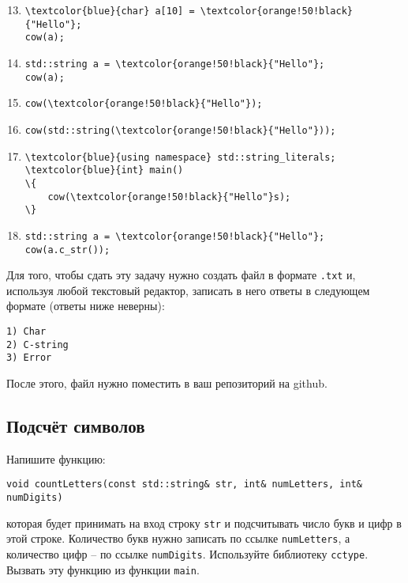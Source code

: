 \documentclass{article}
\begin{document}
\begin{enumerate}
\setcounter{enumi}{12}
\item \begin{Verbatim}[commandchars=\\\{\}]
\textcolor{blue}{char} a[10] = \textcolor{orange!50!black}{"Hello"};
cow(a);
\end{Verbatim}

\item \begin{Verbatim}[commandchars=\\\{\}]
std::string a = \textcolor{orange!50!black}{"Hello"};
cow(a);
\end{Verbatim}

\item \begin{Verbatim}[commandchars=\\\{\}]
cow(\textcolor{orange!50!black}{"Hello"});
\end{Verbatim}

\item \begin{Verbatim}[commandchars=\\\{\}]
cow(std::string(\textcolor{orange!50!black}{"Hello"}));
\end{Verbatim}

\item \begin{Verbatim}[commandchars=\\\{\}]
\textcolor{blue}{using namespace} std::string_literals;
\textcolor{blue}{int} main()
\{
    cow(\textcolor{orange!50!black}{"Hello"}s);
\}
\end{Verbatim}

\item \begin{Verbatim}[commandchars=\\\{\}]
std::string a = \textcolor{orange!50!black}{"Hello"};
cow(a.c_str());
\end{Verbatim}
\end{enumerate}
Для того, чтобы сдать эту задачу нужно создать файл в формате \texttt{.txt} и, используя любой текстовый редактор, записать в него ответы в следующем формате (ответы ниже неверны):
\begin{verbatim}
1) Char
2) C-string
3) Error
\end{verbatim} 
После этого, файл нужно поместить в ваш репозиторий на github.

\subsection{Подсчёт символов}
Напишите функцию:
\begin{lstlisting}
void countLetters(const std::string& str, int& numLetters, int& numDigits)
\end{lstlisting}
которая будет принимать на вход строку \texttt{str} и подсчитывать число букв и цифр в этой строке. Количество букв нужно записать по ссылке \texttt{numLetters}, а количество цифр --  по ссылке \texttt{numDigits}. Используйте библиотеку \texttt{cctype}. Вызвать эту функцию из функции \texttt{main}.
\end{document}

